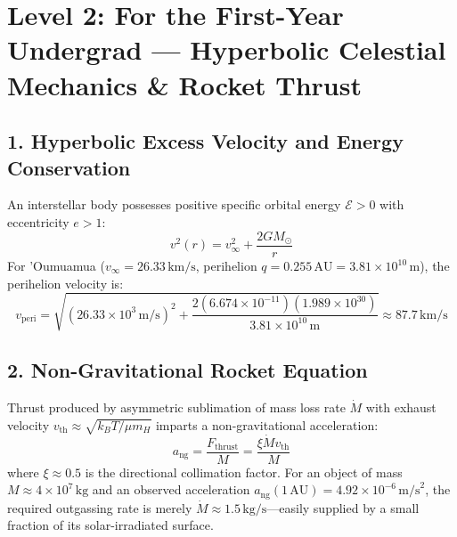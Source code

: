 \documentclass[11pt,a4paper]{article}
\begin{document}
\newpage

\section*{Level 2: For the First-Year Undergrad — Hyperbolic Celestial Mechanics \& Rocket Thrust}

\subsection*{1. Hyperbolic Excess Velocity and Energy Conservation}
An interstellar body possesses positive specific orbital energy $\mathcal{E} > 0$ with eccentricity $e > 1$:
\begin{equation}
v^2(r) = v_\infty^2 + \frac{2 G M_\odot}{r}
\end{equation}
For 'Oumuamua ($v_\infty = 26.33\,\text{km/s}$, perihelion $q = 0.255\,\text{AU} = 3.81 \times 10^{10}\,\text{m}$), the perihelion velocity is:
\begin{equation}
v_{\text{peri}} = \sqrt{(26.33 \times 10^3\,\text{m/s})^2 + \frac{2 (6.674 \times 10^{-11})(1.989 \times 10^{30})}{3.81 \times 10^{10}\,\text{m}}} \approx 87.7\,\text{km/s}
\end{equation}

\subsection*{2. Non-Gravitational Rocket Equation}
Thrust produced by asymmetric sublimation of mass loss rate $\dot{M}$ with exhaust velocity $v_{\text{th}} \approx \sqrt{k_B T / \mu m_H}$ imparts a non-gravitational acceleration:
\begin{equation}
a_{\text{ng}} = \frac{F_{\text{thrust}}}{M} = \frac{\xi \dot{M} v_{\text{th}}}{M}
\end{equation}
where $\xi \approx 0.5$ is the directional collimation factor. For an object of mass $M \approx 4 \times 10^7\,\text{kg}$ and an observed acceleration $a_{\text{ng}}(1\,\text{AU}) = 4.92 \times 10^{-6}\,\text{m/s}^2$, the required outgassing rate is merely $\dot{M} \approx 1.5\,\text{kg/s}$—easily supplied by a small fraction of its solar-irradiated surface.

\newpage

\end{document}
